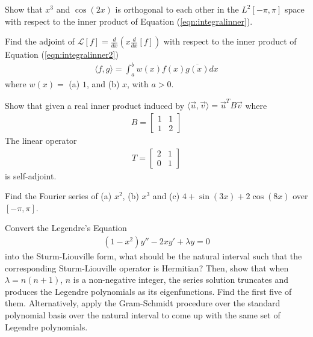 \begin{Exercise}
Show that $x^3$ and $\cos(2x)$ is orthogonal to each other in the $L^2[-\pi, \pi]$ space with respect to the inner product of Equation (\ref{eqn:integralinner}).
\end{Exercise}

\begin{Exercise}
Find the adjoint of $\mathcal{L}[f] = \frac{d}{dx}(x\frac{d}{dx}[f])$ with respect to the inner product of Equation (\ref{eqn:integralinner2})
\begin{align*}
\langle f,g \rangle = \int_a^b w(x) f(x) \overline{g(x)} dx \label{eqn:integralinner2}   
\end{align*}
where $w(x) =$ (a) $1$, and (b) $x$, with $a > 0$.
\end{Exercise}

\begin{Exercise}
Show that given a real inner product induced by $\langle \vec{u},\vec{v} \rangle = \vec{u}^TB\vec{v}$ where
\begin{align*}
B = 
\begin{bmatrix}
1 & 1 \\
1 & 2
\end{bmatrix}
\end{align*}
The linear operator
\begin{align*}
T = 
\begin{bmatrix}
2 & 1 \\
0 & 1
\end{bmatrix}
\end{align*}
is self-adjoint.
\end{Exercise}

\begin{Exercise}
Find the Fourier series of (a) $x^2$, (b) $x^3$ and (c) $4+\sin(3x)+2\cos(8x)$ over $[-\pi, \pi]$.
\end{Exercise}

\begin{Exercise}
Convert the Legendre's Equation
\begin{align*}
(1-x^2) y'' - 2xy' + \lambda y = 0
\end{align*}
into the Sturm-Liouville form, what should be the natural interval such that the corresponding Sturm-Liouville operator is Hermitian? Then, show that when $\lambda = n(n+1)$, $n$ is a non-negative integer, the series solution truncates and produces the Legendre polynomials as its eigenfunctions. Find the first five of them. Alternatively, apply the Gram-Schmidt procedure over the standard polynomial basis over the natural interval to come up with the same set of Legendre polynomials.
\end{Exercise}
